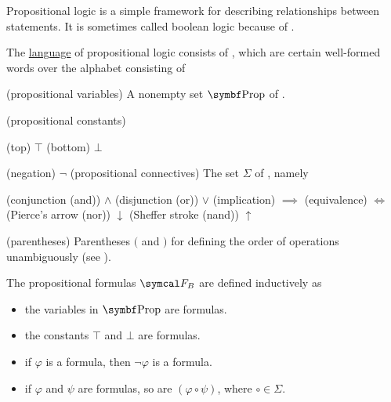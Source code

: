\begin{definition}\label{def:propositional_logic_language}\cite[102]{OpenLogic20201202}
  Propositional logic is a simple framework for describing relationships between statements. It is sometimes called boolean logic because of .

  The \hyperref[def:language]{language} of propositional logic consists of , which are certain well-formed words over the alphabet consisting of
  \begin{description}
    (propositional variables) A nonempty set \( \Cat{Prop} \) of .

    (propositional constants)\mbox{}
    \begin{description}
      (top) \( \top \)
      (bottom) \( \bot \)
    \end{description}

    (negation) \( \neg \)
    (propositional connectives) The set \( \Sigma \) of , namely
    \begin{description}
      (conjunction (and)) \( \land \)
      (disjunction (or)) \( \lor \)
      (implication) \( \implies \)
      (equivalence) \( \iff \)
      (Pierce's arrow (nor)) \( \downarrow \)
      (Sheffer stroke (nand)) \( \uparrow \)
    \end{description}

    (parentheses) Parentheses \( ( \) and \( ) \) for defining the order of operations unambiguously (see ).
  \end{description}

  The propositional formulas \( \Cal{F}_B \) are defined inductively as
  \begin{itemize}
    \item the variables in \( \Cat{Prop} \) are formulas.
    \item the constants \( \top \) and \( \bot \) are formulas.
    \item if \( \varphi \) is a formula, then \( \neg \varphi \) is a formula.
    \item if \( \varphi \) and \( \psi \) are formulas, so are \( (\varphi \circ \psi) \), where \( \circ \in \Sigma \).
  \end{itemize}


\end{definition}
